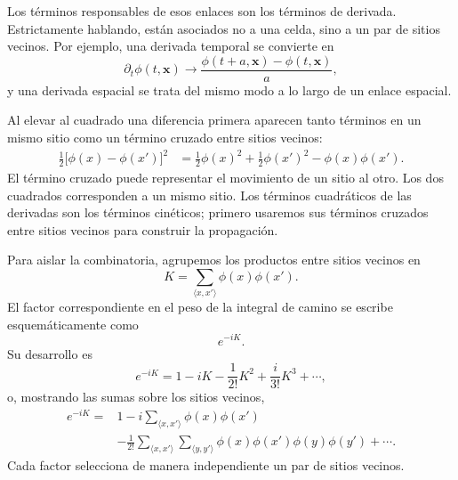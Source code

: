 Los términos responsables de esos enlaces son los términos de derivada. Estrictamente hablando, están asociados no a una celda, sino a un par de sitios vecinos. Por ejemplo, una derivada temporal se convierte en
\begin{equation}
\partial_t\phi(t,\mathbf{x})
\longrightarrow
\frac{\phi(t+a,\mathbf{x})-\phi(t,\mathbf{x})}{a},
\end{equation}
y una derivada espacial se trata del mismo modo a lo largo de un enlace espacial.

\begin{classroomqa}
\end{classroomqa}

Al elevar al cuadrado una diferencia primera aparecen tanto términos en un mismo sitio como un término cruzado entre sitios vecinos:
\begin{align}
\frac{1}{2}\bigl[\phi(x)-\phi(x')\bigr]^2
&=
\frac{1}{2}\phi(x)^2
+\frac{1}{2}\phi(x')^2
-\phi(x)\phi(x').
\end{align}
El término cruzado puede representar el movimiento de un sitio al otro. Los dos cuadrados corresponden a un mismo sitio. Los términos cuadráticos de las derivadas son los términos cinéticos; primero usaremos sus términos cruzados entre sitios vecinos para construir la propagación.

Para aislar la combinatoria, agrupemos los productos entre sitios vecinos en
\begin{equation}
K=\sum_{\langle x,x'\rangle}\phi(x)\phi(x').
\end{equation}
El factor correspondiente en el peso de la integral de camino se escribe esquemáticamente como
\begin{equation}
e^{-iK}.
\end{equation}
Su desarrollo es
\begin{equation}
e^{-iK}
=1-iK-\frac{1}{2!}K^2+\frac{i}{3!}K^3+\cdots,
\end{equation}
o, mostrando las sumas sobre los sitios vecinos,
\begin{align}
e^{-iK}
={}&1
-i\sum_{\langle x,x'\rangle}\phi(x)\phi(x')
\nonumber\\
&-\frac{1}{2!}
\sum_{\langle x,x'\rangle}
\sum_{\langle y,y'\rangle}
\phi(x)\phi(x')\phi(y)\phi(y')
+\cdots .
\end{align}
Cada factor selecciona de manera independiente un par de sitios vecinos.

